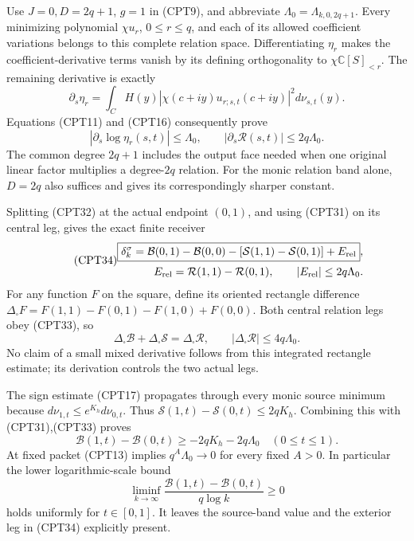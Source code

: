 \documentclass[11pt]{article}
\newcommand{\C}{\mathbb C}
\newcommand{\Bcal}{\mathcal B}
\newcommand{\Rcal}{\mathcal R}
\newcommand{\Scal}{\mathcal S}
\begin{document}
Use \(J=0,D=2q+1\), \(g=1\) in (CPT9), and abbreviate
\(\Lambda_0=\Lambda_{k,0,2q+1}\).
Every minimizing polynomial \(\chi u_r\), \(0\le r\le q\),
and each of its allowed coefficient variations belongs to
this complete relation space.
Differentiating \(\eta_r\) makes the coefficient-derivative
terms vanish by its defining orthogonality to
\(\chi\C[S]_{<r}\).  The remaining derivative is exactly
\[
 \partial_s\eta_r
 =\int_C H(y)|\chi(c+iy)u_{r;s,t}(c+iy)|^2
                                             d\nu_{s,t}(y).
\]
Equations (CPT11) and (CPT16) consequently prove
\begin{equation}\tag{CPT33}
 |\partial_s\log\eta_r(s,t)|\le\Lambda_0,\qquad
 |\partial_s\Rcal(s,t)|\le2q\Lambda_0.
\end{equation}
The common degree \(2q+1\) includes the output face needed when
one original linear factor multiplies a degree-\(2q\) relation.
For the monic relation band alone, \(D=2q\) also suffices and
gives its correspondingly sharper constant.

Splitting (CPT32) at the actual endpoint \((0,1)\), and using
(CPT31) on its central leg, gives the exact finite receiver
\begin{equation}\tag{CPT34}
\begin{split}
 \boxed{\delta_k^\sigma
 =\Bcal(0,1)-\Bcal(0,0)
 -[\Scal(1,1)-\Scal(0,1)]+E_{\rm rel}},\\
 E_{\rm rel}=\Rcal(1,1)-\Rcal(0,1),\qquad
 |E_{\rm rel}|\le2q\Lambda_0.
\end{split}
\end{equation}
For any function \(F\) on the square, define its oriented
rectangle difference
\(\Delta_\square F=F(1,1)-F(0,1)-F(1,0)+F(0,0)\).
Both central relation legs obey (CPT33), so
\begin{equation}\tag{CPT35}
 \boxed{\Delta_\square\Bcal+\Delta_\square\Scal
       =\Delta_\square\Rcal,\qquad
 |\Delta_\square\Rcal|\le4q\Lambda_0.}
\end{equation}
No claim of a small mixed derivative follows from this integrated
rectangle estimate; its derivation controls the two actual legs.

The sign estimate (CPT17) propagates through every monic
source minimum because
\(d\nu_{1,t}\le e^{K_h}d\nu_{0,t}\).
Thus
\(\Scal(1,t)-\Scal(0,t)\le2qK_h\).
Combining this with (CPT31),(CPT33) proves
\begin{equation}\tag{CPT36}
 \Bcal(1,t)-\Bcal(0,t)\ge-2qK_h-2q\Lambda_0
 \quad(0\le t\le1).
\end{equation}
At fixed packet (CPT13) implies \(q^A\Lambda_0\to0\) for every
fixed \(A>0\).  In particular the lower logarithmic-scale bound
\[
 \liminf_{k\to\infty}
 \frac{\Bcal(1,t)-\Bcal(0,t)}{q\log k}\ge0
\]
holds uniformly for \(t\in[0,1]\).
It leaves the source-band value and the exterior leg in
(CPT34) explicitly present.
\end{document}
